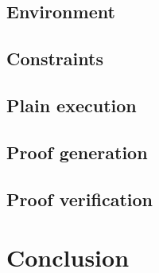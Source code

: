 \documentclass[12pt, a4paper]{report}
\begin{document}
\section{Environment}\label{sec:environment}

\section{Constraints}\label{sec:constraints}

\section{Plain execution}\label{sec:plain}

\section{Proof generation}\label{sec:proofgen}

\section{Proof verification}\label{sec:proofver}

\chapter{Conclusion}\label{chap:conclusion}
\end{document}
